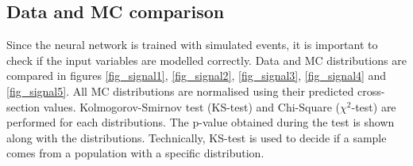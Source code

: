 \subsection{Data and MC comparison}

Since the neural network is trained with simulated events, it is important to check if the input variables
are modelled correctly. Data and MC distributions are compared in figures \ref{fig_signal1}, \ref{fig_signal2}, \ref{fig_signal3}, \ref{fig_signal4} and \ref{fig_signal5}. All MC distributions are normalised using their predicted cross-section values. Kolmogorov-Smirnov test (KS-test) and Chi-Square ($\chi^{2}$-test) are performed for each distributions. The p-value obtained during the test is shown along with the distributions. Technically, KS-test is used to decide if a sample comes from a population with a specific distribution. 


